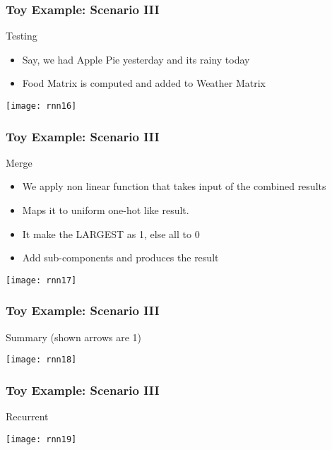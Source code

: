 \begin{frame}[fragile] \frametitle{Toy Example: Scenario III}
Testing
\begin{itemize}
\item Say, we had Apple Pie yesterday and its rainy today
\item Food Matrix is computed and added to Weather Matrix
\end{itemize}
\begin{center}
\texttt{[image: rnn16]}
\end{center}
\end{frame}

\begin{frame}[fragile] \frametitle{Toy Example: Scenario III}
Merge
\begin{itemize}
\item We apply non linear function that takes input of the combined results
\item Maps it to uniform one-hot like result.
\item It make the LARGEST as 1, else all to 0
\item Add sub-components  and produces the result
\end{itemize}
\begin{center}
\texttt{[image: rnn17]}
\end{center}
\end{frame}

\begin{frame}[fragile] \frametitle{Toy Example: Scenario III}
Summary (shown arrows are 1)
\begin{center}
\texttt{[image: rnn18]}
\end{center}
\end{frame}

\begin{frame}[fragile] \frametitle{Toy Example: Scenario III}
Recurrent
\begin{center}
\texttt{[image: rnn19]}
\end{center}
\end{frame}


